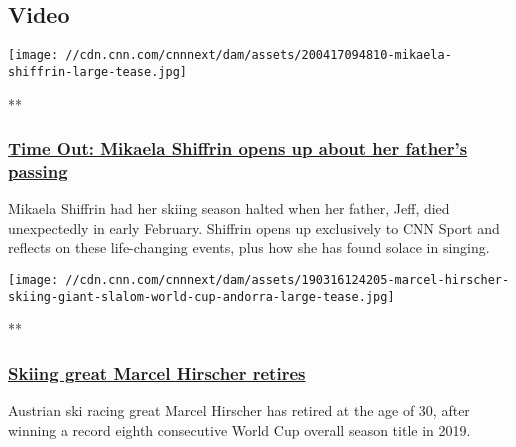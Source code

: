 \hypertarget{video-}{%
\subsection{Video~}\label{video-}}

\href{/videos/sports/2020/04/17/mikaela-shiffrin-time-out-dad-workout-guitar-singing-weeknd-spt-intl-lon-orig.cnn}{}

\texttt{[image: //cdn.cnn.com/cnnnext/dam/assets/200417094810-mikaela-shiffrin-large-tease.jpg]}

**

\hypertarget{time-out-mikaela-shiffrin-opens-up-about-her-fathers-passing}{%
\subsubsection{\texorpdfstring{\href{/videos/sports/2020/04/17/mikaela-shiffrin-time-out-dad-workout-guitar-singing-weeknd-spt-intl-lon-orig.cnn}{Time
Out: Mikaela Shiffrin opens up about her father's
passing}}{Time Out: Mikaela Shiffrin opens up about her father's passing}}\label{time-out-mikaela-shiffrin-opens-up-about-her-fathers-passing}}

Mikaela Shiffrin had her skiing season halted when her father, Jeff,
died unexpectedly in early February. Shiffrin opens up exclusively to
CNN Sport and reflects on these life-changing events, plus how she has
found solace in singing.

\href{/videos/sports/2019/09/04/marcel-hirscher-retirement-skiing-austria-olympic-spt-intl-alpine-edge-lon-orig.cnn}{}

\texttt{[image: //cdn.cnn.com/cnnnext/dam/assets/190316124205-marcel-hirscher-skiing-giant-slalom-world-cup-andorra-large-tease.jpg]}

**

\hypertarget{skiing-great-marcel-hirscher-retires}{%
\subsubsection{\texorpdfstring{\href{/videos/sports/2019/09/04/marcel-hirscher-retirement-skiing-austria-olympic-spt-intl-alpine-edge-lon-orig.cnn}{Skiing
great Marcel Hirscher
retires}}{Skiing great Marcel Hirscher retires}}\label{skiing-great-marcel-hirscher-retires}}

Austrian ski racing great Marcel Hirscher has retired at the age of 30,
after winning a record eighth consecutive World Cup overall season title
in 2019.

\href{/videos/sports/2019/03/18/mikaela-shiffrin-skiing-world-cup-alpine-edge-andorra.cnn}{}

